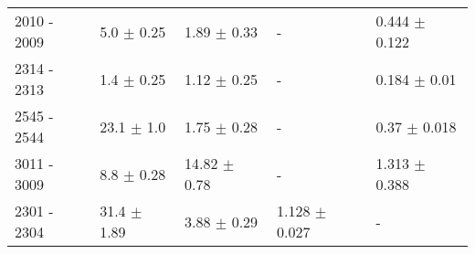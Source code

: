 \begin{table}
\begin{tabular}{l l l l l}
    \\
    2010 - 2009	& 5.0 $\pm$ 0.25 & 1.89 $\pm$ 0.33 & - & 0.444 $\pm$ 0.122 %
    \\
    2314 - 2313	& 1.4 $\pm$ 0.25 & 1.12 $\pm$ 0.25 & - & 0.184 $\pm$ 0.01 %
    \\
    2545 - 2544	& 23.1 $\pm$ 1.0 & 1.75 $\pm$ 0.28 & - & 0.37 $\pm$ 0.018 %
    \\
    3011 - 3009	& 8.8 $\pm$ 0.28 & 14.82 $\pm$ 0.78 & - & 1.313 $\pm$ 0.388 %
    \\
    2301 - 2304	& 31.4 $\pm$ 1.89 & 3.88 $\pm$ 0.29 & 1.128 $\pm$ 0.027 & - %
    \\
\hline
\end{tabular}
\end{table}